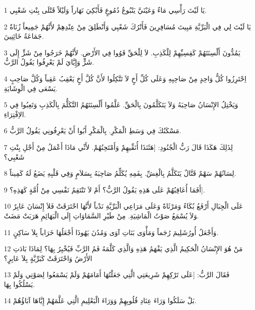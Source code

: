 \par 1 يَا لَيْتَ رَأْسِي مَاءٌ وَعَيْنَيَّ يَنْبُوعُ دُمُوعٍ فَأَبْكِيَ نَهَاراً وَلَيْلاً قَتْلَى بِنْتِ شَعْبِي.
\par 2 يَا لَيْتَ لِي فِي الْبَرِّيَّةِ مَبِيتَ مُسَافِرِينَ فَأَتْرُكَ شَعْبِي وَأَنْطَلِقَ مِنْ عِنْدِهِمْ لأَنَّهُمْ جَمِيعاً زُنَاةٌ جَمَاعَةُ خَائِنِينَ.
\par 3 يَمُدُّونَ أَلْسِنَتَهُمْ كَقِسِيِّهِمْ لِلْكَذِبِ. لاَ لِلْحَقِّ قَوُوا فِي الأَرْضِ. لأَنَّهُمْ خَرَجُوا مِنْ شَرٍّ إِلَى شَرٍّ وَإِيَّايَ لَمْ يَعْرِفُوا يَقُولُ الرَّبُّ.
\par 4 اِحْتَرِزُوا كُلُّ وَاحِدٍ مِنْ صَاحِبِهِ وَعَلَى كُلِّ أَخٍ لاَ تَتَّكِلُوا لأَنَّ كُلَّ أَخٍ يَعْقِبُ عَقِباً وَكُلَّ صَاحِبٍ يَسْعَى فِي الْوِشَايَةِ.
\par 5 وَيَخْتِلُ الإِنْسَانُ صَاحِبَهُ وَلاَ يَتَكَلَّمُونَ بِالْحَقِّ. عَلَّمُوا أَلْسِنَتَهُمُ التَّكَلُّمَ بِالْكَذِبِ وَتَعِبُوا فِي الاِفْتِرَاءِ.
\par 6 مَسْكَنُكَ فِي وَسَطِ الْمَكْرِ. بِالْمَكْرِ أَبُوا أَنْ يَعْرِفُونِي يَقُولُ الرَّبُّ.
\par 7 لِذَلِكَ هَكَذَا قَالَ رَبُّ الْجُنُودِ: [هَئَنَذَا أُنَقِّيهِمْ وَأَمْتَحِنُهُمْ. لأَنِّي مَاذَا أَعْمَلُ مِنْ أَجْلِ بِنْتِ شَعْبِي؟
\par 8 لِسَانُهُمْ سَهْمٌ قَتَّالٌ يَتَكَلَّمُ بِالْغِشِّ. بِفَمِهِ يُكَلِّمُ صَاحِبَهُ بِسَلاَمٍ وَفِي قَلْبِهِ يَضَعُ لَهُ كَمِيناً.
\par 9 أَفَمَا أُعَاقِبُهُمْ عَلَى هَذِهِ يَقُولُ الرَّبُّ؟ أَمْ لاَ تَنْتَقِمُ نَفْسِي مِنْ أُمَّةٍ كَهَذِهِ؟].
\par 10 عَلَى الْجِبَالِ أَرْفَعُ بُكَاءً وَمَرْثَاةً وَعَلَى مَرَاعِي الْبَرِّيَّةِ نَدْباً لأَنَّهَا احْتَرَقَتْ فَلاَ إِنْسَانَ عَابِرٌ وَلاَ يُسْمَعُ صَوْتُ الْمَاشِيَةِ. مِنْ طَيْرِ السَّمَاوَاتِ إِلَى الْبَهَائِمِ هَرَبَتْ مَضَتْ.
\par 11 وَأَجْعَلُ أُورُشَلِيمَ رُجَماً وَمَأْوَى بَنَاتِ آوَى وَمُدُنَ يَهُوذَا أَجْعَلُهَا خَرَاباً بِلاَ سَاكِنٍ.
\par 12 مَنْ هُوَ الإِنْسَانُ الْحَكِيمُ الَّذِي يَفْهَمُ هَذِهِ وَالَّذِي كَلَّمَهُ فَمُ الرَّبِّ فَيُخْبِرُ بِهَا؟ لِمَاذَا بَادَتِ الأَرْضُ وَاحْتَرَقَتْ كَبَرِّيَّةٍ بِلاَ عَابِرٍ؟
\par 13 فَقَالَ الرَّبُّ: [عَلَى تَرْكِهِمْ شَرِيعَتِي الَّتِي جَعَلْتُهَا أَمَامَهُمْ وَلَمْ يَسْمَعُوا لِصَوْتِي وَلَمْ يَسْلُكُوا بِهَا.
\par 14 بَلْ سَلَكُوا وَرَاءَ عِنَادِ قُلُوبِهِمْ وَوَرَاءَ الْبَعْلِيمِ الَّتِي عَلَّمَهُمْ إِيَّاهَا آبَاؤُهُمْ.
